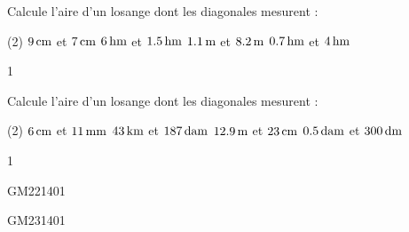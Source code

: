 \documentclass[a4paper,11pt]{report}
\begin{document}
\begin{exo}{    %
Calcule l'aire d'un losange dont les diagonales mesurent :
\begin{tasks}(2)
	\task $\tunit{9}{cm}$ et $\tunit{7}{cm}$
	\task $\tunit{6}{hm}$ et $\tunit{1,5}{hm}$
	\task $\tunit{1,1}{m}$ et $\tunit{8,2}{m}$
	\task $\tunit{0,7}{hm}$ et $\tunit{4}{hm}$
\end{tasks}
}{1}
\end{exo}

\begin{exo}{    %
Calcule l'aire d'un losange dont les diagonales mesurent :
\begin{tasks}(2)
	\task $\tunit{6}{cm}$ et $\tunit{11}{mm}$
	\task $\tunit{43}{km}$ et $\tunit{187}{dam}$
	\task $\tunit{12,9}{m}$ et $\tunit{23}{cm}$
	\task $\tunit{0,5}{dam}$ et $\tunit{300}{dm}$
\end{tasks}
}{1}
\end{exo}








\begin{exol}{GM22}{140}{1}      %
\end{exol}
\begin{exol}{GM23}{140}{1}      %
\end{exol}
\end{document}
